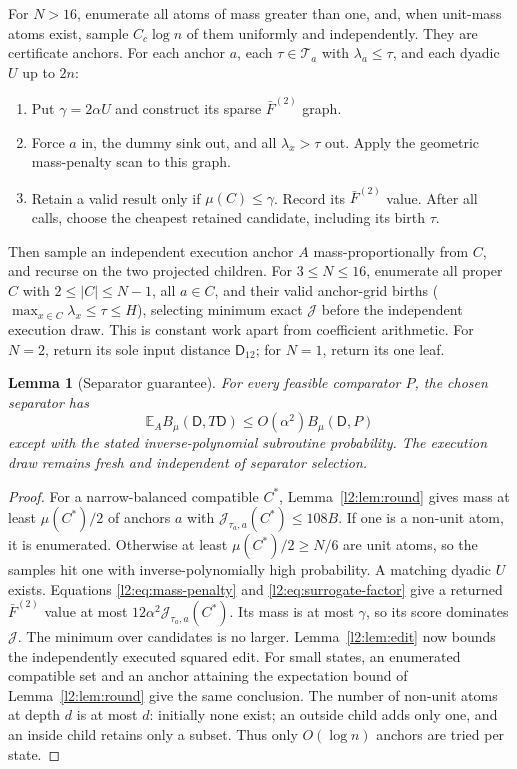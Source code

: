 \documentclass[11pt]{article}
\newtheorem{lemma}[theorem]{Lemma}
\theoremstyle{definition}
\newcommand{\E}{\mathbb E}
\begin{document}
For $N>16$, enumerate all atoms of mass greater than one, and, when
unit-mass atoms exist, sample $C_c\log n$ of them uniformly and
independently. They are
certificate anchors. For each anchor $a$, each $\tau\in\mathcal T_a$
with $\lambda_a\le\tau$, and each dyadic $U$ up to $2n$:
\begin{enumerate}[leftmargin=*]
\item Put $\gamma=2\alpha U$ and construct its sparse $\bar F^{(2)}$ graph.
\item Force $a$ in, the dummy sink out, and all $\lambda_x>\tau$ out.
Apply the geometric mass-penalty scan to this graph.
\item Retain a valid result only if $\mu(C)\le\gamma$.
Record its $\bar F^{(2)}$ value. After all calls, choose the cheapest
retained candidate, including its birth $\tau$.
\end{enumerate}
Then sample an independent execution anchor $A$ mass-proportionally
from $C$, and recurse on the two projected children.
For $3\le N\le16$, enumerate all proper $C$ with $2\le|C|\le N-1$,
all $a\in C$, and their valid anchor-grid births
($\max_{x\in C}\lambda_x\le\tau\le H$), selecting minimum exact
$\mathcal J$ before the independent execution draw. This is constant
work apart from coefficient arithmetic. For $N=2$, return its sole
input distance $\mathsf D_{12}$; for $N=1$, return its one leaf.

\begin{lemma}[Separator guarantee]\label{l2:lem:separator}
For every feasible comparator $P$, the chosen separator has
\[
 \E_A B_\mu(\mathsf D,T\mathsf D)\le O(\alpha^2)B_\mu(\mathsf D,P)
\]
except with the stated inverse-polynomial subroutine probability.
The execution draw remains fresh and independent of separator selection.
\end{lemma}
\begin{proof}
For a narrow-balanced compatible $C^*$, Lemma~\ref{l2:lem:round} gives
mass at least $\mu(C^*)/2$ of anchors $a$ with
$\mathcal J_{\tau_a,a}(C^*)\le108B$.
If one is a non-unit atom, it is enumerated. Otherwise at least
$\mu(C^*)/2\ge N/6$ are unit atoms, so the samples hit one with
inverse-polynomially high probability. A matching dyadic $U$ exists.
Equations \eqref{l2:eq:mass-penalty} and \eqref{l2:eq:surrogate-factor} give
a returned $\bar F^{(2)}$ value at most $12\alpha^2\mathcal J_{\tau_a,a}(C^*)$.
Its mass is at most $\gamma$, so its score dominates $\mathcal J$.
The minimum over candidates is no larger. Lemma~\ref{l2:lem:edit} now
bounds the independently executed squared edit.
For small states, an enumerated compatible set and an anchor attaining
the expectation bound of Lemma~\ref{l2:lem:round} give the same conclusion.
The number of non-unit atoms at depth $d$ is at most $d$: initially
none exist; an outside child adds only one, and an inside child retains
only a subset. Thus only $O(\log n)$ anchors are tried per state.
\end{proof}
\end{document}

